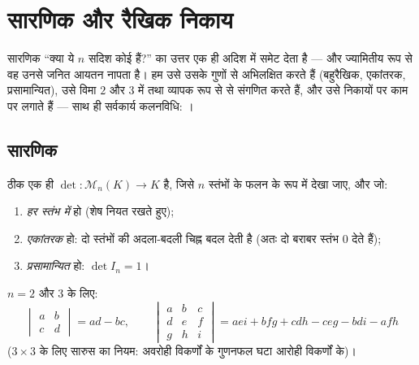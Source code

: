 \chapter{सारणिक और रैखिक निकाय}\label{ch:b1:det}

सारणिक ``क्या ये $n$ सदिश कोई  हैं?'' का उत्तर एक ही अदिश में समेट देता
है --- और ज्यामितीय रूप से वह उनसे जनित आयतन नापता है। हम उसे उसके गुणों से
अभिलक्षित करते हैं (बहुरैखिक, एकांतरक, प्रसामान्यित), उसे विमा $2$ और $3$
में तथा व्यापक रूप से  से संगणित करते हैं, और उसे 
निकायों पर काम पर लगाते हैं --- साथ ही सर्वकार्य कलनविधि: ।

\section{सारणिक}

\begin{theorem}[अभिलक्षण]\label{thm:b1:det:def}
ठीक एक ही  $\det \colon \mathcal{M}_n(K) \to K$ है, जिसे $n$
स्तंभों के फलन के रूप में देखा जाए, और जो:
\begin{enumerate}
  \item \emph{हर स्तंभ में } हो (शेष नियत रखते हुए);
  \item \emph{एकांतरक} हो: दो स्तंभों की अदला-बदली चिह्न बदल देती है (अतः दो
  बराबर स्तंभ $0$ देते हैं);
  \item \emph{प्रसामान्यित} हो: $\det I_n = 1$।
\end{enumerate}
$n = 2$ और $3$ के लिए:
\[
\begin{vmatrix} a & b\\ c & d\end{vmatrix} = ad - bc,
\qquad
\begin{vmatrix} a & b & c\\ d & e & f\\ g & h & i\end{vmatrix}
= aei + bfg + cdh - ceg - bdi - afh
\]
($3 \times 3$ के लिए सारुस का नियम: अवरोही विकर्णों के गुणनफल घटा आरोही
विकर्णों के)।
\end{theorem}
\admitted

